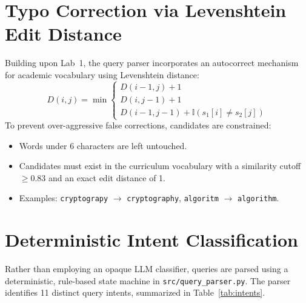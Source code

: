 \documentclass[12pt,a4paper]{report}
\begin{document}
\section{Typo Correction via Levenshtein Edit Distance}
Building upon Lab~1, the query parser incorporates an autocorrect mechanism for academic vocabulary using Levenshtein distance:
\begin{equation}
    D(i, j) = \min \begin{cases}
        D(i-1, j) + 1 \\
        D(i, j-1) + 1 \\
        D(i-1, j-1) + \mathbb{I}(s_1[i] \neq s_2[j])
    \end{cases}
\end{equation}
To prevent over-aggressive false corrections, candidates are constrained:
\begin{itemize}
    \item Words under 6 characters are left untouched.
    \item Candidates must exist in the curriculum vocabulary with a similarity cutoff $\ge 0.83$ and an exact edit distance of 1.
    \item Examples: \texttt{cryptograpy} $\rightarrow$ \texttt{cryptography}, \texttt{algoritm} $\rightarrow$ \texttt{algorithm}.
\end{itemize}

\section{Deterministic Intent Classification}
Rather than employing an opaque LLM classifier, queries are parsed using a deterministic, rule-based state machine in \texttt{src/query\_parser.py}. The parser identifies 11 distinct query intents, summarized in Table~\ref{tab:intents}.
\end{document}
